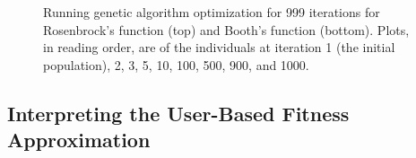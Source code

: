 \documentclass[conference]{IEEEtran}
\begin{document}
\begin{figure}[htbp]
    \caption{Running genetic algorithm optimization for 999 iterations for Rosenbrock's
        function (top) and Booth's function (bottom). Plots, in reading order, are of the individuals at iteration 1 (the initial
        population), 2, 3, 5, 10, 100, 500, 900, and 1000.}
    \label{test}
\end{figure}

\subsection{Interpreting the User-Based Fitness Approximation}
\end{document}

